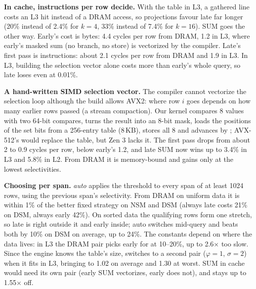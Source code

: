 \textbf{In cache, instructions per row decide.} With the table in L3, a gathered line costs an
L3 hit instead of a DRAM access, so projections favour late far longer (20\% instead of 2.4\% for
$k{=}4$, 33\% instead of 7.4\% for $k{=}16$). SUM goes the other way. Early's cost is bytes: 4.4
cycles per row from DRAM, 1.2 in L3, where early's masked sum (no branch, no store) is
vectorized by the compiler. Late's first pass is instructions: about 2.1 cycles per row from DRAM
and 1.9 in L3. In L3, building the selection vector alone costs more than early's whole query,
so late loses even at 0.01\%.

\textbf{A hand-written SIMD selection vector.} The compiler cannot vectorize the selection loop
although the build allows AVX2: where row $i$ goes depends on how many earlier rows passed (a
stream compaction). Our kernel compares 8 values with two 64-bit compares, turns the result into
an 8-bit mask, loads the positions of the set bits from a 256-entry table (8\,KB), stores all 8
and advances by ; AVX-512's  would replace the table, but
Zen 3 lacks it. The first pass drops from about 2 to 0.9 cycles per row, below early's 1.2, and
late SUM now wins up to 3.4\% in L3 and 5.8\% in L2. From DRAM it is memory-bound and gains only
at the lowest selectivities.

\textbf{Choosing per span.} \emph{auto} applies the threshold to every span of at least 1024
rows, using the previous span's selectivity. From DRAM on uniform data it is within 1\% of the
better fixed strategy on NSM and DSM (always late costs 21\% on DSM, always early 42\%). On
sorted data the qualifying rows form one stretch, so late is right outside it and early inside;
auto switches mid-query and beats both by 10\% on DSM on average, up to 24\%. The constants
depend on where the data lives: in L3 the DRAM pair picks early for  at
10--20\%, up to 2.6$\times$ too slow. Since the engine knows the table's size,
 switches to a second pair ($\varphi = 1$, $\sigma = 2$) when it fits in
L3, bringing  to 1.02 on average and 1.30 at worst. SUM in cache would need its
own pair (early SUM vectorizes, early  does not), and stays up to 1.55$\times$ off.

